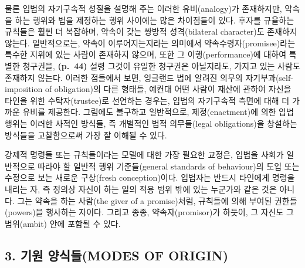 물론 입법의 자기구속적 성질을 설명해 주는 이러한 유비(analogy)가
존재하지만, 약속을 하는 행위와 법을 제정하는 행위 사이에는 많은
차이점들이 있다. 후자를 규율하는 규칙들은 훨씬 더 복잡하며, 약속이 갖는
쌍방적 성격(bilateral character)도 존재하지 않는다. 일반적으로는, 약속이
 이루어지는지라는 의미에서
약속수령자(promisee)라는 특수한 지위에 있는 사람이 존재하지 않으며, 또한
그 이행(performance)에 대하여 특별한 청구권을, \textbf{(p.~44)} 설령
그것이 유일한 청구권은 아닐지라도, 가지고 있는 사람도 존재하지 않는다.
이러한 점들에서 보면, 잉글랜드 법에 알려진 의무의
자기부과(self-imposition of obligation)의 다른 형태들, 예컨대 어떤
사람이 재산에 관하여 자신을 타인을 위한 수탁자(trustee)로 선언하는
경우는, 입법의 자기구속적 측면에 대해 더 가까운 유비를 제공한다.
그럼에도 불구하고 일반적으로, 제정(enactment)에 의한 입법 행위는 이러한
사적인 방식들, 즉 개별적인 법적 의무들(legal obligations)을 창설하는
방식들을 고찰함으로써 가장 잘 이해될 수 있다.

강제적 명령들 또는 규칙들이라는 모델에 대한 가장 필요한 교정은, 입법을
사회가 일반적으로 따라야 할 일반적 행위 기준들(general standards of
behaviour)의 도입 또는 수정으로 보는 새로운 구상(fresh conception)이다.
입법자는 반드시 타인에게 명령을 내리는 자, 즉 정의상 자신이 하는 일의
적용 범위 밖에 있는 누군가와 같은 것은 아니다. 그는 약속을 하는 사람(the
giver of a promise)처럼, 규칙들에 의해 부여된 권한들(powers)을 행사하는
자이다. 그리고 종종, 약속자(promisor)가 
하듯이, 그 자신도 그 범위(ambit) 안에 포함될 수 있다.

\subsection{3. 기원 양식들(MODES OF
ORIGIN)}\label{uxae30uxc6d0-uxc591uxc2dduxb4e4modes-of-origin}

